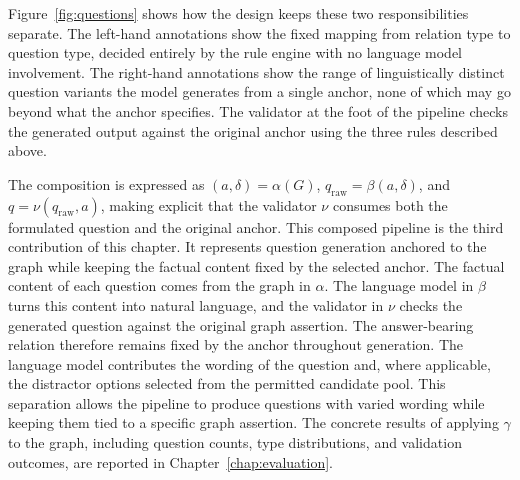 Figure~\ref{fig:questions} shows how the design keeps these two responsibilities separate. The left-hand annotations show the fixed mapping from relation type to question type, decided entirely by the rule engine with no language model involvement. The right-hand annotations show the range of linguistically distinct question variants the model generates from a single anchor, none of which may go beyond what the anchor specifies. The validator at the foot of the pipeline checks the generated output
against the original anchor using the three rules described above.

The composition is expressed as $(a,\delta) = \alpha(G)$, $q_{\text{raw}} = \beta(a,\delta)$, and $q = \nu(q_{\text{raw}}, a)$, making explicit that the validator $\nu$ consumes both the formulated question and the original anchor. This composed pipeline is the third contribution of this chapter. It represents question generation anchored
to the graph while keeping the factual content fixed by the selected
anchor. The factual content of each question comes from the graph in
$\alpha$. The language model in $\beta$ turns this content into natural
language, and the validator in $\nu$ checks the generated question against
the original graph assertion. The answer-bearing relation therefore remains
fixed by the anchor throughout generation. The language model contributes
the wording of the question and, where applicable, the distractor options
selected from the permitted candidate pool. This separation allows the
pipeline to produce questions with varied wording while keeping them tied
to a specific graph assertion. The concrete results of applying $\gamma$
to the graph, including question counts, type distributions, and validation
outcomes, are reported in Chapter~\ref{chap:evaluation}.
